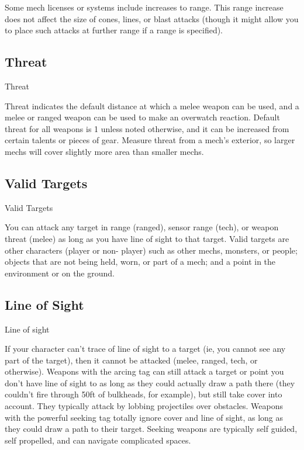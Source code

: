 Some mech licenses or systems include increases to range. This range increase does not affect
the size of cones, lines, or blast attacks (though it might allow you to place such attacks at further
range if a range is specified).

\subsection{Threat}
                                                     Threat

Threat indicates the default distance at which a melee weapon can be used, and a melee or
ranged weapon can be used to make an overwatch reaction. Default threat for all weapons is 1
unless noted otherwise, and it can be increased from certain talents or pieces of gear. Measure
threat from a mech’s exterior, so larger mechs will cover slightly more area than smaller mechs.

\subsection{Valid Targets}
                                                Valid Targets

You can attack any target in range (ranged), sensor range (tech), or weapon threat (melee) as
long as you have line of sight to that target. Valid targets are other characters (player or non-
player) such as other mechs, monsters, or people; objects that are not being held, worn, or part of
a mech; and a point in the environment or on the ground.

\subsection{Line of Sight}
                                                Line of sight

If your character can’t trace of line of sight to a target (ie, you cannot see any part of the target),
then it cannot be attacked (melee, ranged, tech, or otherwise). Weapons with the arcing tag can
still attack a target or point you don’t have line of sight to as long as they could actually draw a
path there (they couldn’t fire through 50ft of bulkheads, for example), but still take cover into
account. They typically attack by lobbing projectiles over obstacles. Weapons with the powerful
seeking tag totally ignore cover and line of sight, as long as they could draw a path to their
target. Seeking weapons are typically self guided, self propelled, and can navigate complicated
spaces.



